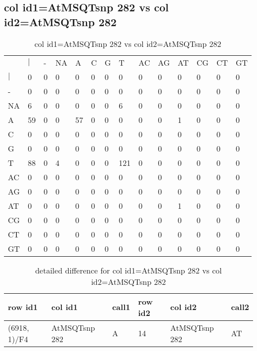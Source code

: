 \subsection{col id1=AtMSQTsnp 282 vs col id2=AtMSQTsnp 282}
\begin{center}
\begin{longtable}{|l|l|l|l|l|l|l|l|l|l|l|l|l|l|}
\caption{col id1=AtMSQTsnp 282 vs col id2=AtMSQTsnp 282} \label{table_dm824}\\
\hline
\\
\hline
&$|$&-&NA&A&C&G&T&AC&AG&AT&CG&CT&GT\\
$|$&0&0&0&0&0&0&0&0&0&0&0&0&0\\
-&0&0&0&0&0&0&0&0&0&0&0&0&0\\
NA&6&0&0&0&0&0&6&0&0&0&0&0&0\\
A&59&0&0&57&0&0&0&0&0&1&0&0&0\\
C&0&0&0&0&0&0&0&0&0&0&0&0&0\\
G&0&0&0&0&0&0&0&0&0&0&0&0&0\\
T&88&0&4&0&0&0&121&0&0&0&0&0&0\\
AC&0&0&0&0&0&0&0&0&0&0&0&0&0\\
AG&0&0&0&0&0&0&0&0&0&0&0&0&0\\
AT&0&0&0&0&0&0&0&0&0&1&0&0&0\\
CG&0&0&0&0&0&0&0&0&0&0&0&0&0\\
CT&0&0&0&0&0&0&0&0&0&0&0&0&0\\
GT&0&0&0&0&0&0&0&0&0&0&0&0&0\\
\hline
\end{longtable}
\end{center}

\begin{center}
\begin{longtable}{|l|l|l|l|l|l|}
\caption{detailed difference for col id1=AtMSQTsnp 282 vs col id2=AtMSQTsnp 282} \label{table_dm825}\\
\hline
row id1&col id1&call1&row id2&col id2&call2\\
\hline
(6918, 1)/F4&AtMSQTsnp 282&A&14&AtMSQTsnp 282&AT\\
\hline
\end{longtable}
\end{center}

